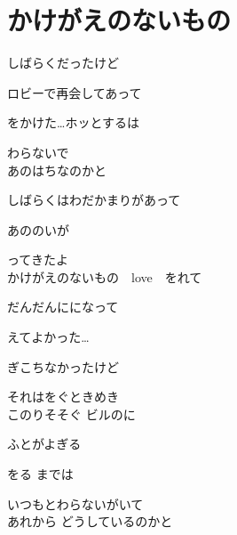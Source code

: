 \section{ かけがえのないもの}


\large{

しばらくだったけど

ロビーで再会してあって

をかけた…ホッとするは　

わらないで
\\

あのはちなのかと

しばらくはわだかまりがあって

あののいが　

ってきたよ
\\

かけがえのないもの　love　をれて

だんだんにになって

えてよかった…

ぎこちなかったけど

それはをぐときめき
\\

このりそそぐ ビルのに

ふとがよぎる

をる までは

いつもとわらないがいて
\\

あれから どうしているのかと

}
